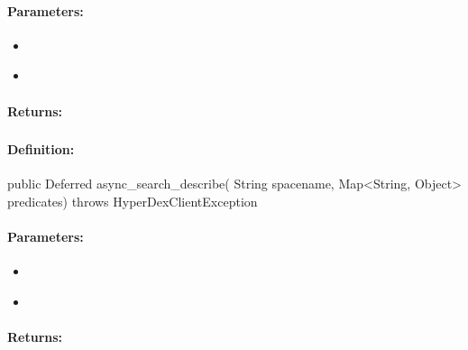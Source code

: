 \paragraph{Parameters:}
\begin{itemize}[noitemsep]
\item {}\\

\item {}\\

\end{itemize}

\paragraph{Returns:}


\pagebreak
\subsubsection{}
\label{api:java:async_search_describe}


\paragraph{Definition:}
\begin{javacode}
public Deferred async_search_describe(
        String spacename,
        Map<String, Object> predicates) throws HyperDexClientException
\end{javacode}

\paragraph{Parameters:}
\begin{itemize}[noitemsep]
\item {}\\

\item {}\\

\end{itemize}

\paragraph{Returns:}


